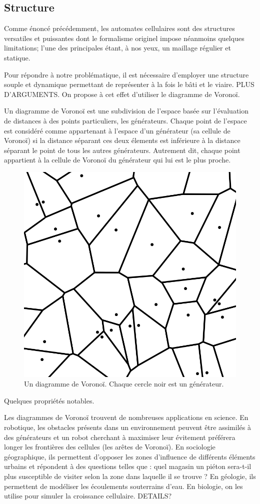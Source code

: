 \documentclass[10pt]{article}
\begin{document}
\subsection{Structure}

Comme énoncé précédemment, les automates cellulaires sont des
structures versatiles et puissantes dont le formalisme originel impose
néanmoins quelques limitations; l'une des principales étant, à nos
yeux, un maillage régulier et statique.

Pour répondre à notre problématique, il est nécessaire d'employer une
structure souple et dynamique permettant de représenter à la fois le
bâti et le viaire. PLUS D'ARGUMENTS. On propose à cet effet d'utiliser
le diagramme de Voronoï.

Un diagramme de Voronoï est une subdivision de l'espace basée sur
l'évaluation de distances à des points particuliers, les
générateurs. Chaque point de l'espace est considéré comme appartenant
à l'espace d'un générateur (sa cellule de Voronoï) si la distance
séparant ces deux élements est inférieure à la distance séparant le
point de tous les autres générateurs. Autrement dit, chaque point
appartient à la cellule de Voronoï du générateur qui lui est le plus
proche.

\begin{figure}[h]
  \centering
  \includegraphics[width=0.5\linewidth]{images/voronoi.png}
  \caption{Un diagramme de Voronoï. Chaque cercle noir est un générateur.}
  \label{fig:voronoi}
\end{figure}

Quelques propriétés notables.

Les diagrammes de Voronoï trouvent de nombreuses applications en
science. En robotique, les obstacles présents dans un environnement
peuvent être assimilés à des générateurs et un robot cherchant à
maximiser leur évitement préférera longer les frontières des cellules
(les arêtes de Voronoï). En sociologie géographique, ils permettent
d'opposer les zones d'influence de différents éléments urbains et
répondent à des questions telles que : quel magasin un piéton
sera-t-il plus susceptible de visiter selon la zone dans laquelle il
se trouve ? En géologie, ils permettent de modéliser les écoulements
souterrains d'eau. En biologie, on les utilise pour simuler la
croissance cellulaire. DETAILS?
\end{document}

